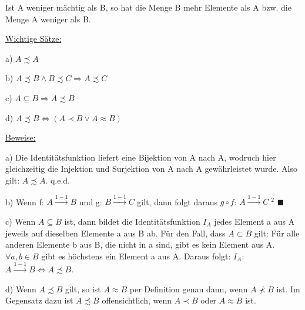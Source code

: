 \documentclass[12pt]{article}
\begin{document}
		\bigskip
		
		
		Ist A weniger mächtig als B, so hat die Menge B mehr Elemente als A bzw. die Menge A weniger als B.
		
		\underline{Wichtige Sätze:}
		
		{
			\begin{singlespace}
				a) $A \precsim A$
				
				b) $A \precsim B \land B \precsim C \Rightarrow A \precsim C$
				
				c) $A \subseteq B \Rightarrow A \precsim B$
				
				d) $A \precsim B \Leftrightarrow (A \prec B \lor A \approx B)$
			\end{singlespace}
		}
		
		\underline{Beweise:}
		
		a) Die Identitätsfunktion liefert eine Bijektion von A nach A, 
		wodruch hier gleichzeitig die Injektion und Surjektion von A nach A 
		gewährleistet wurde. Also gilt: $A \precsim A$. \hspace*{2mm} q.e.d.
		
		b) Wenn f: $A \xrightarrow{1-1} B$ und g: $B \xrightarrow{1-1} C$ gilt, dann folgt daraus
		$g \circ f$: $A \xrightarrow{1-1} C$.$^2$ $\blacksquare$
		
		c) Wenn $A \subseteq B$ ist, dann bildet die Identitätsfunktion $I_A$ jedes Element a aus A 
		jeweils auf dieselben Elemente a aus B ab. Für den Fall, dass $A \subset B$ gilt: 
		Für alle anderen Elemente b aus B, die nicht in a sind, gibt es kein Element aus A.
		$\forall a, b \in B$ gibt es höchstens ein Element a aus A.
		Daraus folgt: $I_A$: $A \xrightarrow{1-1} B \Leftrightarrow A \precsim B$.
		
		d) Wenn $A \precsim B$ gilt, so ist $A \approx B$ per Definition genau dann, wenn $A \not \prec B$ ist.
		Im Gegensatz dazu ist $A \precsim B$ offensichtlich, wenn $A \prec B$ oder $A \approx B$ ist.
		
\end{document}
